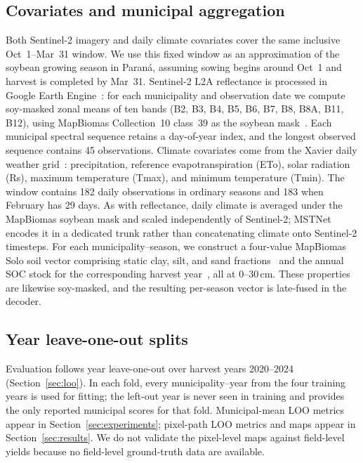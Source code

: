 \subsection{Covariates and municipal aggregation}
Both Sentinel-2 imagery and daily climate covariates cover the same inclusive Oct~1--Mar~31 window. We use this fixed window as an approximation of the soybean growing season in Paran\'{a}, assuming sowing begins around Oct~1 and harvest is completed by Mar~31.
Sentinel-2 L2A reflectance is processed in Google Earth Engine~\citep{gorelick2017gee}: for each municipality and observation date we compute soy-masked zonal means of ten bands (B2, B3, B4, B5, B6, B7, B8, B8A, B11, B12), using MapBiomas Collection~10 class~39 as the soybean mask~\citep{mapbiomas2025}.
Each municipal spectral sequence retains a day-of-year index, and the longest observed sequence contains 45 observations.
Climate covariates come from the Xavier daily weather grid~\citep{xavier2022}: precipitation, reference evapotranspiration (ETo), solar radiation (Rs), maximum temperature (Tmax), and minimum temperature (Tmin).
The window contains 182 daily observations in ordinary seasons and 183 when February has 29 days.
As with reflectance, daily climate is averaged under the MapBiomas soybean mask and scaled independently of Sentinel-2; MSTNet encodes it in a dedicated trunk rather than concatenating climate onto Sentinel-2 timesteps.
For each municipality--season, we construct a four-value MapBiomas Solo soil vector comprising static clay, silt, and sand fractions~\citep{mapbiomassoil2025} and the annual SOC stock for the corresponding harvest year~\citep{mapbiomassoc2025}, all at 0--30\,cm. These properties are likewise soy-masked, and the resulting per-season vector is late-fused in the decoder.

\subsection{Year leave-one-out splits}
Evaluation follows year leave-one-out over harvest years 2020--2024 (Section~\ref{sec:loo}).
In each fold, every municipality--year from the four training years is used for fitting; the left-out year is never seen in training and provides the only reported municipal scores for that fold.
Municipal-mean LOO metrics appear in Section~\ref{sec:experiments}; pixel-path LOO metrics and maps appear in Section~\ref{sec:results}.
We do not validate the pixel-level maps against field-level yields because no field-level ground-truth data are available.